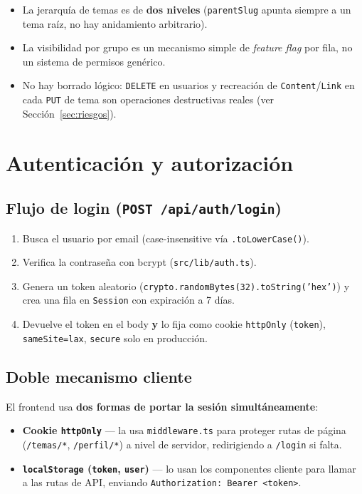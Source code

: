 \documentclass[11pt,a4paper]{article}
\newcommand{\code}[1]{\texttt{#1}}
\begin{document}
\begin{itemize}
  \item La jerarquía de temas es de \textbf{dos niveles} (\code{parentSlug} apunta siempre a un tema raíz, no hay anidamiento arbitrario).
  \item La visibilidad por grupo es un mecanismo simple de \emph{feature flag} por fila, no un sistema de permisos genérico.
  \item No hay borrado lógico: \code{DELETE} en usuarios y recreación de \code{Content}/\code{Link} en cada \code{PUT} de tema son operaciones destructivas reales (ver Sección~\ref{sec:riesgos}).
\end{itemize}

\section{Autenticación y autorización}

\subsection{Flujo de login (\code{POST /api/auth/login})}

\begin{enumerate}
  \item Busca el usuario por email (case-insensitive vía \code{.toLowerCase()}).
  \item Verifica la contraseña con bcrypt (\code{src/lib/auth.ts}).
  \item Genera un token aleatorio (\code{crypto.randomBytes(32).toString('hex')}) y crea una fila en \code{Session} con expiración a 7 días.
  \item Devuelve el token en el body \textbf{y} lo fija como cookie \code{httpOnly} (\code{token}), \code{sameSite=lax}, \code{secure} solo en producción.
\end{enumerate}

\subsection{Doble mecanismo cliente}

El frontend usa \textbf{dos formas de portar la sesión simultáneamente}:

\begin{itemize}
  \item \textbf{Cookie \code{httpOnly}} --- la usa \code{middleware.ts} para proteger rutas de página (\code{/temas/*}, \code{/perfil/*}) a nivel de servidor, redirigiendo a \code{/login} si falta.
  \item \textbf{\code{localStorage} (\code{token}, \code{user})} --- lo usan los componentes cliente para llamar a las rutas de API, enviando \code{Authorization: Bearer <token>}.
\end{itemize}
\end{document}
